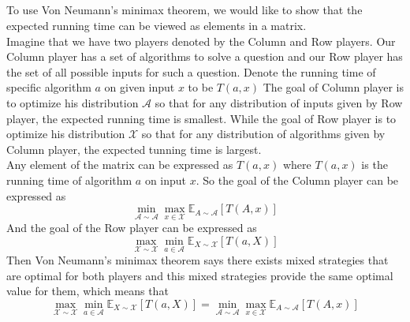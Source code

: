 \documentclass[12pt,letterpaper]{article}
\begin{document}
\subsection{}
To use Von Neumann's minimax theorem,
we would like to show that the expected running time can be viewed as 
elements in a matrix.\\
Imagine that we have two players denoted by the Column and Row players.
Our Column player has a set of algorithms to solve a question 
and our Row player has the set of all possible inputs for such a question.
Denote the running time of specific algorithm $a$ on given input $x$ to be $T(a,x)$
The goal of Column player is to optimize his distribution $\mathscr{A}$
so that for any distribution of inputs given by Row player, 
the expected running time is smallest.
While the goal of Row player is to optimize his distribution $\mathscr{X}$
so that for any distribution of algorithms given by Column player,
the expected tunning time is largest.\\
Any element of the matrix can be expressed as $T(a,x)$ 
where $T(a,x)$ is the running time of algorithm $a$ on input $x$.
So the goal of the Column player can be expressed as 
$$\min_{\mathscr{A}\sim\mathcal{A}}\max_{x\in\mathcal{X}}\mathbb{E}_{A\sim\mathscr{A}}\left[T(A,x)\right]$$
And the goal of the Row player can be expressed as 
$$\max_{\mathscr{X}\sim\mathcal{X}}\min_{a\in\mathcal{A}}\mathbb{E}_{X\sim\mathscr{X}}\left[T(a,X)\right]$$
Then Von Neumann's minimax theorem says there exists mixed strategies that are optimal for both players and 
this mixed strategies provide the same optimal value for them, 
which means that 
$$\max_{\mathscr{X}\sim\mathcal{X}}\min_{a\in\mathcal{A}}\mathbb{E}_{X\sim\mathscr{X}}\left[T(a,X)\right]=
\min_{\mathscr{A}\sim\mathcal{A}}\max_{x\in\mathcal{X}}\mathbb{E}_{A\sim\mathscr{A}}\left[T(A,x)\right]$$

\subsection{}

\subsection{}

\newpage
\section{}
\end{document}
